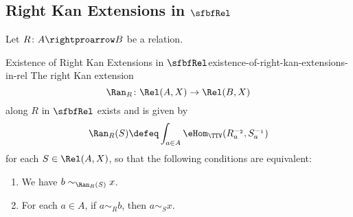 \subsection{Right Kan Extensions in $\sfbfRel$}\label{subsection-right-kan-extensions-in-rel}
Let $R\colon A\rightproarrow B$ be a relation.
\begin{proposition}{Existence of Right Kan Extensions in $\sfbfRel$}{existence-of-right-kan-extensions-in-rel}%
    The right Kan extension
    \[
        \Ran_{R}%
        \colon%
        \Rel(A,X)%
        \to%
        \Rel(B,X)%
    \]%
    along $R$ in $\sfbfRel$ exists and is given by
    \[
        \Ran_{R}(S)%
        \defeq%
        \int_{a\in A}\eHom_{\TTV}(R^{-_{2}}_{a},S^{-_{1}}_{a})
    \]%
    for each $S\in\Rel(A,X)$, so that the following conditions are equivalent:
    \begin{enumerate}%
        \item We have $b\sim_{\Ran_{R}(S)}x$.
        \item For each $a\in A$, if $a\sim_{R}b$, then $a\sim_{S}x$.
    \end{enumerate}%
\end{proposition}
